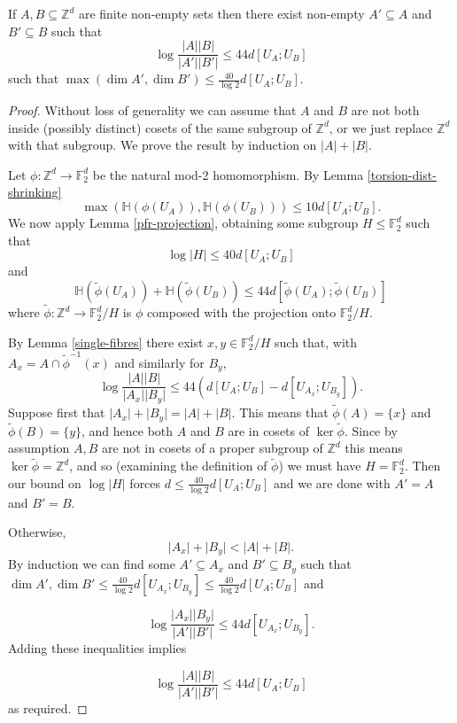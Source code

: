 \begin{theorem}\label{weak-pfr-asymm}\leanok
If $A,B\subseteq \mathbb{Z}^d$ are finite non-empty sets then there exist non-empty $A'\subseteq A$ and $B'\subseteq B$ such that
\[\log\frac{\lvert A\rvert\lvert B\rvert}{\lvert A'\rvert\lvert B'\rvert}\leq 44d[U_A;U_B]\]
such that $\max(\dim A',\dim B')\leq \frac{40}{\log 2} d[U_A;U_B]$.
\end{theorem}
\begin{proof}
Without loss of generality we can assume that $A$ and $B$ are not both inside (possibly distinct) cosets of the same subgroup of $\mathbb{Z}^d$, or we just replace $\mathbb{Z}^d$ with that subgroup. We prove the result by induction on $\lvert A\rvert+\lvert B\rvert$.

Let $\phi:\mathbb{Z}^d\to \mathbb{F}_2^d$ be the natural mod-2 homomorphism. By Lemma \ref{torsion-dist-shrinking}
\[\max(\mathbb{H}(\phi(U_A)),\mathbb{H}(\phi(U_B)))\leq 10d[U_A;U_B].\]
We now apply Lemma \ref{pfr-projection}, obtaining some subgroup $H\leq \mathbb{F}_2^d$ such that
\[\log \lvert H\rvert \leq 40d[U_A;U_B]\]
and
\[\mathbb{H}(\tilde{\phi}(U_A))+\mathbb{H}(\tilde{\phi}(U_B))\leq 44 d[\tilde{\phi}(U_A);\tilde{\phi}(U_B)]\]
where $\tilde{\phi}:\mathbb{Z}^d\to \mathbb{F}_2^d/H$ is $\phi$ composed with the projection onto $\mathbb{F}_2^d/H$.


By Lemma \ref{single-fibres} there exist $x,y\in \mathbb{F}_2^d/H$ such that, with $A_x=A\cap \tilde{\phi}^{-1}(x)$ and similarly for $B_y$,
\[\log \frac{\lvert A\rvert\lvert B\rvert}{\lvert A_x\rvert\lvert B_y\rvert}\leq 44(d[U_A;U_B]-d[U_{A_x};U_{B_y}]).\]
Suppose first that $\lvert A_x\rvert+\lvert B_y\rvert=\lvert A\rvert+\lvert B\rvert$. This means that $\tilde{\phi}(A)=\{x\}$ and $\tilde{\phi}(B)=\{y\}$, and hence both $A$ and $B$ are in cosets of $\ker \tilde{\phi}$. Since by assumption $A,B$ are not in cosets of a proper subgroup of $\mathbb{Z}^d$ this means $\ker\tilde{\phi}=\mathbb{Z}^d$, and so (examining the definition of $\tilde{\phi}$) we must have $H=\mathbb{F}_2^d$. Then our bound on $\log\lvert H\rvert$ forces $d\leq \frac{40}{\log 2}d[U_A;U_B]$ and we are done with $A'=A$ and $B'=B$.

Otherwise,
\[\lvert A_x\rvert+\lvert B_y\rvert <\lvert A\rvert+\lvert B\rvert.\]
By induction we can find some $A'\subseteq A_x$ and $B'\subseteq B_y$ such that $\dim A',\dim B'\leq \frac{40}{\log 2} d[U_{A_x};U_{B_y}]\leq \frac{40}{\log 2}d[U_A;U_B]$ and

\[\log \frac{\lvert A_x\rvert\lvert B_y\rvert}{\lvert A'\rvert\lvert B'\rvert}\leq 44d[U_{A_x};U_{B_y}].\]
Adding these inequalities implies

\[\log\frac{\lvert A\rvert\lvert B\rvert}{\lvert A'\rvert\lvert B'\rvert}\leq 44d[U_A;U_B]\]
as required.
\end{proof}

